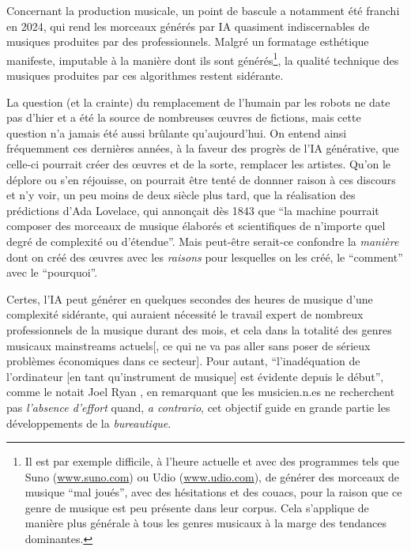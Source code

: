 Concernant la production musicale, un point de bascule a notamment été franchi en 2024, qui rend les morceaux générés par IA quasiment indiscernables de musiques produites par des professionnels. Malgré un formatage esthétique manifeste, imputable à la manière dont ils sont générés\footnote{Il est par exemple difficile, à l'heure actuelle et avec des programmes tels que Suno (\url{www.suno.com}) ou Udio (\url{www.udio.com}), de générer des morceaux de musique ``mal joués'', avec des hésitations et des couacs, pour la raison que ce genre de musique est peu présente dans leur corpus. Cela s'applique de manière plus générale à tous les genres musicaux à la marge des tendances dominantes.}, la qualité technique des musiques produites par ces algorithmes restent sidérante.

La question (et la crainte) du remplacement de l'humain par les robots ne date pas d'hier et a été la source de nombreuses œuvres de fictions,
mais cette question n'a jamais été aussi brûlante qu'aujourd'hui. On entend ainsi fréquemment ces dernières années, à la faveur des progrès de l'IA générative, que celle-ci pourrait créer des œuvres et de la sorte, remplacer les artistes. Qu'on le déplore ou s'en réjouisse, on pourrait être tenté de donnner raison à ces discours et n'y voir, un peu moins de deux siècle plus tard, que la réalisation des prédictions d'Ada Lovelace, qui annonçait dès 1843 que ``la machine pourrait composer des morceaux de musique élaborés et scientifiques de n’importe quel degré de complexité ou d’étendue''\cite{lovelace_translators_1843}. Mais peut-être serait-ce confondre la \textit{manière} dont on créé des œuvres avec les \textit{raisons} pour lesquelles on les créé, le ``comment'' avec le ``pourquoi''.

Certes, l'IA peut générer en quelques secondes des heures de musique d'une complexité sidérante, qui auraient nécessité le travail expert de nombreux professionnels de la musique durant des mois, et cela dans la totalité des genres musicaux mainstreams actuels[, ce qui ne va pas aller sans poser de sérieux problèmes économiques dans ce secteur]. Pour autant, ``l'inadéquation de l'ordinateur [en tant qu'instrument de musique] est évidente depuis le début'', comme le notait Joel Ryan \cite{ryan_remarks_1991}, en remarquant que les musicien.n.es ne recherchent pas \textit{l'absence d'effort} quand, \textit{a contrario}, cet objectif guide en grande partie les développements de la \textit{bureautique}.

